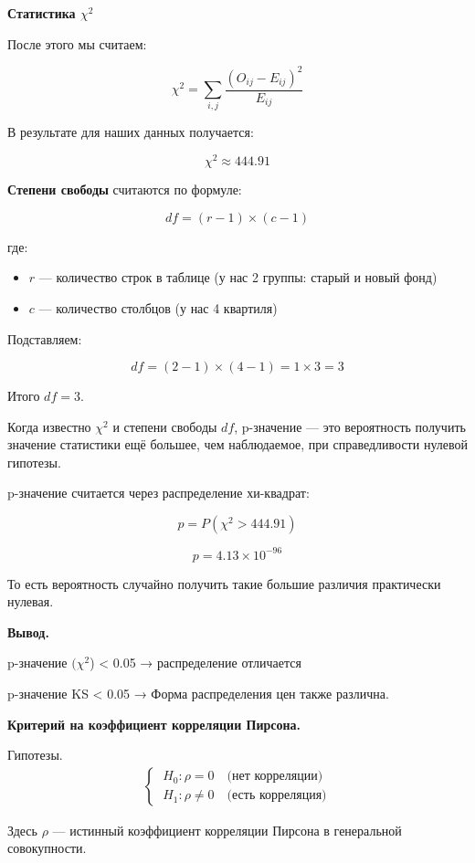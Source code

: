 \documentclass[12pt]{article}
\begin{document}
	\textbf{Статистика $\chi^2$}
	
	После этого мы считаем:
	
	$$ \chi^2 = \sum_{i,j} \frac{(O_{ij} - E_{ij})^2}{E_{ij}} $$
	
	В результате для наших данных получается:
	
	$$ \chi^2 \approx 444.91 $$
	
	\textbf{Степени свободы} считаются по формуле:
	
	$$ df = (r-1) \times (c-1) $$
	
	где:
	\begin{itemize}
		\item $ r $ — количество строк в таблице (у нас 2 группы: старый и новый фонд)
		\item $ c $ — количество столбцов (у нас 4 квартиля)
	\end{itemize}
	
	Подставляем:
	
	$$ df = (2-1) \times (4-1) = 1 \times 3 = 3 $$
	
	Итого $ df = 3 $.
	
	Когда известно $\chi^2$ и степени свободы $df$, p-значение — это вероятность получить значение статистики ещё большее, чем наблюдаемое, при справедливости нулевой гипотезы.
	
	p-значение считается через распределение хи-квадрат:
	
	$$ p = P(\chi^2 > 444.91) $$
	
	$$ p = 4.13 \times 10^{-96} $$
	
	То есть вероятность случайно получить такие большие различия практически нулевая.
	\vspace*{1em}
	
	\textbf{Вывод.}
	
	p-значение $(\chi^2$) < 0.05 → распределение отличается
	
	p-значение KS < 0.05 → Форма распределения цен также различна.
	\newpage
	
	\textbf{Критерий на коэффициент корреляции Пирсона.}
	
	Гипотезы.
	\begin{gather*}
		\begin{cases}
			\ H_0: \rho = 0 \quad \text{(нет корреляции)} \\
			\ H_1: \rho \neq 0 \quad \text{(есть корреляция)}
		\end{cases}
	\end{gather*}
	
	Здесь $\rho$ — истинный коэффициент корреляции Пирсона в генеральной совокупности.
	\vspace*{1em}
	
\end{document}
